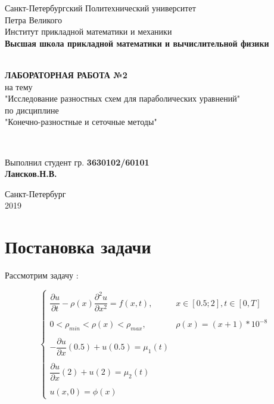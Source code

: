 \documentclass[12pt]{article}
\renewcommand{\listoffigures}{\begingroup  %
\tocsection
\tocfile{\listfigurename}{lof}
\endgroup}
\renewcommand{\listoftables}{\begingroup  %
\tocsection
\tocfile{\listtablename}{lot}
\endgroup}
\begin{document}
\begin{titlepage}
	\center
		Санкт-Петербургский Политехнический 
		университет \\ Петра Великого\\
		Институт прикладной математики и механики
		\\ \textbf{Высшая школа прикладной математики и вычислительной физики}

	\vfill ~
	\textbf{
		\\ \large ЛАБОРАТОРНАЯ РАБОТА №2
	}
	\\	на тему 
	\\ "Исследование разностных схем для параболических уравнений"
	\\ по дисциплине
	\\ "Конечно-разностные и сеточные методы"

	\vfill ~

	Выполнил студент гр. \textbf{3630102/60101} \\
	\textbf{Лансков.Н.В.} \\ 

\vfill

{\large}	Санкт-Петербург
\\ 2019
\end{titlepage}


\tableofcontents 
\newpage
\listoffigures
\newpage
\listoftables
\newpage

\section{Постановка задачи}

Рассмотрим задачу :

$$
\begin{cases}
\dfrac{\partial u}{\partial t} - \rho(x)\dfrac{\partial ^2u}{\partial x^2} = f(x, t), & x \in [0.5;2],  t \in [0, T] \\ \\
0 < \rho_{min} < \rho(x) < \rho_{max}, & \rho(x) = (x+1)*10^{-8} \\ \\
 - \dfrac{\partial u}{\partial x}(0.5) + u(0.5) = \mu_1(t) \\ \\
\dfrac{\partial u}{\partial x}(2) + u(2) = \mu_2(t) \\ \\
u(x, 0) = \phi(x)
\end{cases}
$$
\end{document}

